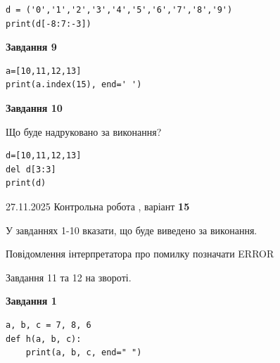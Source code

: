 \documentclass[12pt, ukrainian]{article}
\begin{document}
{{{{{{{{{{{{{{{\begin{minipage}[t]{10.5cm}
\begin{verbatim}
d = ('0','1','2','3','4','5','6','7','8','9')
print(d[-8:7:-3])
\end{verbatim}



\begin{center}
\textbf{Завдання 9}
\end{center}

\begin{verbatim}
a=[10,11,12,13]
print(a.index(15), end=' ')
\end{verbatim}



\begin{center}
\textbf{Завдання 10}
\end{center}
Що буде надруковано за виконання?\par
\begin{verbatim}
d=[10,11,12,13]
del d[3:3]
print(d)
\end{verbatim}

\end{minipage}

}
\newpage

{{ 27.11.2025 Контрольна робота , варіант  \No \textbf { 15 }\par}}
{

{%



У завданнях 1-10 вказати, що буде виведено за виконання.

Повідомлення інтерпретатора про помилку позначати ERROR

Завдання 11 та 12 на звороті.

\begin{minipage}[t]{7.5cm}

\begin{center}
\textbf{Завдання 1}
\end{center}

\begin{verbatim}
a, b, c = 7, 8, 6
def h(a, b, c):
    print(a, b, c, end=" ")


\end{verbatim}
\end{minipage}}}}}}}}}}}}}}}}}
\end{document}
